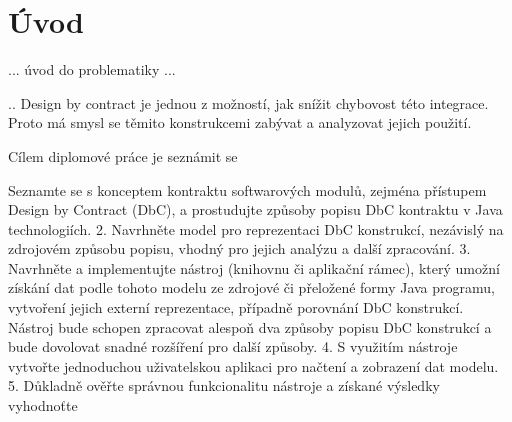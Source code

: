 \chapter{Úvod}

... úvod do problematiky ...

 .. Design by contract je jednou z možností, jak snížit chybovost této integrace. Proto má smysl se těmito konstrukcemi zabývat a analyzovat jejich použití.


Cílem diplomové práce je seznámit se 


 Seznamte se s konceptem kontraktu softwarových modulů, zejména přístupem Design by Contract (DbC), a prostudujte způsoby popisu DbC kontraktu v Java technologiích.
2. Navrhněte model pro reprezentaci DbC konstrukcí, nezávislý na zdrojovém způsobu popisu, vhodný pro jejich analýzu a další zpracování.
3. Navrhněte a implementujte nástroj (knihovnu či aplikační rámec), který umožní získání dat podle tohoto modelu ze zdrojové či přeložené formy Java programu, vytvoření jejich externí reprezentace, případně porovnání DbC konstrukcí. Nástroj bude schopen zpracovat alespoň dva způsoby popisu DbC konstrukcí a bude dovolovat snadné rozšíření pro další způsoby.
4. S využitím nástroje vytvořte jednoduchou uživatelskou aplikaci pro načtení a zobrazení dat modelu.
5. Důkladně ověřte správnou funkcionalitu nástroje a získané výsledky vyhodnoťte
 